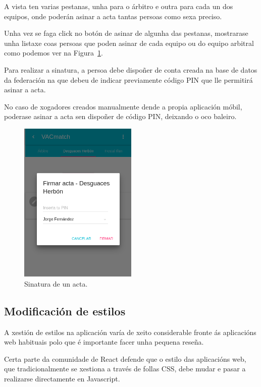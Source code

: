     A vista ten varias pestanas, unha para o árbitro e outra para cada un dos 
equipos, onde poderán asinar a acta tantas persoas como sexa preciso.

    Unha vez se faga click no botón de asinar de algunha das pestanas, 
mostrarase unha listaxe coas persoas que poden asinar de cada equipo ou do 
equipo arbitral como podemos ver na Figura~\ref{fig:design:signreport}.

    Para realizar a sinatura, a persoa debe dispoñer de conta creada na base de 
datos da federación na que debeu de indicar previamente código PIN que lle 
permitirá asinar a acta.

    No caso de xogadores creados manualmente dende a propia aplicación móbil, 
poderase asinar a acta sen dispoñer de código PIN, deixando o oco baleiro.

    \begin{figure}[h!]
      \begin{center}
      \includegraphics[width=0.5\textwidth]{./img/demo/11_sign.png}
      \caption{Sinatura de un acta.}
      \label{fig:design:signreport}
      \end{center}
    \end{figure}

    \subsection{Modificación de estilos}
    A xestión de estilos na aplicación varía de xeito considerable fronte ás 
aplicacións web habituais polo que é importante facer unha pequena reseña.

    Certa parte da comunidade de React defende que o estilo das aplicacións 
web, que tradicionalmente se xestiona a través de follas CSS, debe mudar e 
pasar a realizarse directamente en Javascript.

